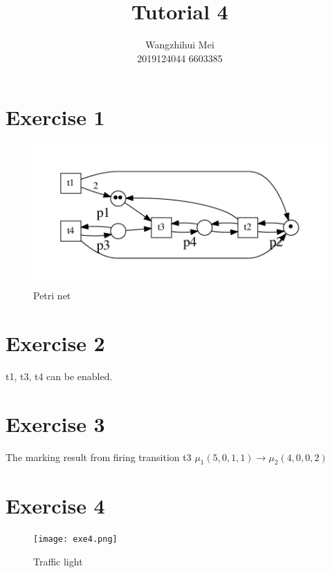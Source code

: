 \documentclass[12pt]{article}%
\begin{document}
\title{Tutorial 4}
\author{Wangzhihui Mei \\ 2019124044 6603385}
\date{}
\maketitle

\section*{Exercise 1}
\begin{figure}[h]
    \centering
    \includegraphics[]{exe1}
    \caption{Petri net }
    \label{}
\end{figure}




\section*{Exercise 2}
t1, t3, t4 can be enabled.

\section*{Exercise 3}
The marking result from firing transition t3
$\mu_1(5,0,1,1)\rightarrow \mu_2(4,0,0,2)$

\clearpage
\section*{Exercise 4}
\begin{figure}[h]
    \centering
    \texttt{[image: exe4.png]}
    \caption{Traffic light }
    \label{}
\end{figure}
\end{document}
